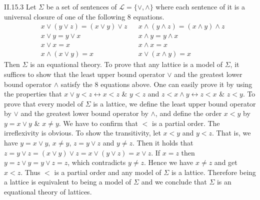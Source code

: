 \documentclass[12pt]{article}
\begin{document}
\begin{customthm}{II.15.3}
  Let $\Sigma$ be a set of sentences of $\mathcal{L}=\{\vee,\wedge\}$ where each sentence of it is a universal closure of one of the following 8 equations.
  \begin{align*}
    &x\vee(y\vee z)=(x\vee y)\vee z &&x\wedge(y\wedge z)=(x\wedge y)\wedge z \\
    &x\vee y=y\vee x &&x\wedge y=y\wedge x \\
    &x\vee x=x &&x\wedge x=x \\
    &x\wedge(x\vee y)=x &&x\vee(x\wedge y)=x
  \end{align*}
  Then $\Sigma$ is an equational theory. To prove that any lattice is a model of $\Sigma$, it suffices to show that the least upper bound operator $\vee$ and the greatest lower bound operator $\wedge$ satisfy the 8 equations above. One can easily prove it by using the properties that $x\vee y<z\leftrightarrow x<z$ \& $y<z$ and $z<x\wedge y\leftrightarrow z<x$ \& $z<y$. To prove that every model of $\Sigma$ is a lattice, we define the least upper bound operator by $\vee$ and the greatest lower bound operator by $\wedge$, and define the order $x<y$ by $y=x\vee y$ \& $x\neq y$. We have to confirm that $<$ is a partial order. The irreflexivity is obvious. To show the transitivity, let $x<y$ and $y<z$. That is, we have $y=x\vee y$, $x\neq y$, $z=y\vee z$ and $y\neq z$. Then it holds that $z=y\vee z=(x\vee y)\vee z=x\vee(y\vee z)=x\vee z$. If $x=z$ then $y=z\vee y=y\vee z=z$, which contradicts $y\neq z$. Hence we have $x\neq z$ and get $x<z$. Thus $<$ is a partial order and any model of $\Sigma$ is a lattice. Therefore being a lattice is equivalent to being a model of $\Sigma$ and we conclude that $\Sigma$ is an equational theory of lattices.
\end{customthm}
\end{document}

